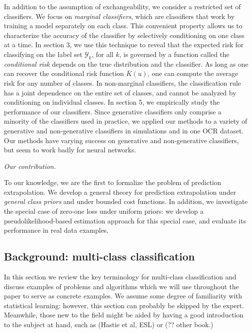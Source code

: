 \documentclass[12pt]{article}
\begin{document}
In addition to the assumption of exchangeability, we consider a
restricted set of classifiers.  We focus on \emph{marginal
classifiers}, which are classifiers that work by training a model
separately on each class.  This convenient property allows us to
characterize the accuracy of the classifier by selectively
conditioning on one class at a time.  In section 3, we use this
technique to reveal that the expected risk for classifying on the
label set $\mathcal{Y}_k$, for all $k$, is governed by a function
called the \emph{conditional risk} depends on the true distribution
and the classifier.  As long as one can recover the conditional risk
function $\bar{K}(u)$, one can compute the average risk for any number
of classes.  In non-marginal classifiers, the classification rule
has a joint dependence on the entire set of classes, and cannot be
analyzed by conditioning on individual classes.  In section 5, we
empirically study the performance of our classifiers.  Since
generative classifiers only comprise a minority of the classifiers
used in practice, we applied our methods to a variety of generative
and non-generative classifiers in simulations and in one OCR dataset.
Our methods have varying success on generative and non-generative
classifiers, but seem to work badly for neural networks.
\newline

\noindent\emph{Our contribution.}

To our knowledge, we are the first to formalize the problem of
prediction extrapolation.  We develop a general theory for prediction
extrapolation under \emph{general class priors} and under bounded cost
functions.  In addition, we investigate the special case of zero-one
loss under uniform priors: we develop a pseudolikelihood-based
estimation approach for this special case, and evaluate its
performance in real data examples.

\subsection{Background: multi-class classification}

In this section we review the key terminology for multi-class
classification and discuss examples of problems and algorithms which
we will use throughout the paper to serve as concrete examples.  We
assume some degree of familiarity with statistical learning: however,
this section can probably be skipped by the expert.  Meanwhile, those
new to the field might be aided by having a good introduction to the
subject at hand, such as (Hastie et al, ESL) or (?? other book.)
\end{document}
